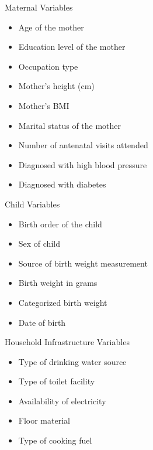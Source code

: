 \documentclass[
  ignorenonframetext,
]{beamer}
\providecommand{\tightlist}{%
  \setlength{\itemsep}{0pt}\setlength{\parskip}{0pt}}\usepackage{longtable,booktabs,array}
\begin{document}
\begin{frame}{Maternal Variables}
\label{maternal-variables}
\begin{itemize}
\tightlist
\item
  Age of the mother\\
\item
  Education level of the mother\\
\item
  Occupation type\\
\item
  Mother's height (cm)\\
\item
  Mother's BMI\\
\item
  Marital status of the mother\\
\item
  Number of antenatal visits attended\\
\item
  Diagnosed with high blood pressure\\
\item
  Diagnosed with diabetes
\end{itemize}
\end{frame}

\begin{frame}{Child Variables}
\label{child-variables}
\begin{itemize}
\tightlist
\item
  Birth order of the child\\
\item
  Sex of child\\
\item
  Source of birth weight measurement\\
\item
  Birth weight in grams\\
\item
  Categorized birth weight\\
\item
  Date of birth
\end{itemize}
\end{frame}

\begin{frame}{Household Infrastructure Variables}
\label{household-infrastructure-variables}
\begin{itemize}
\tightlist
\item
  Type of drinking water source\\
\item
  Type of toilet facility\\
\item
  Availability of electricity\\
\item
  Floor material\\
\item
  Type of cooking fuel
\end{itemize}
\end{frame}
\end{document}

